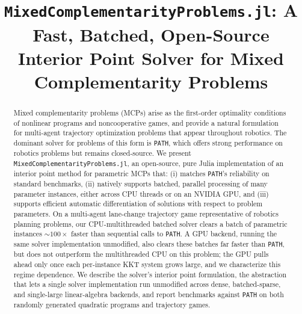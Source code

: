\documentclass[conference]{IEEEtran}
\begin{document}
\title{\Large \bf \texttt{MixedComplementarityProblems.jl}: A Fast, Batched,
  Open-Source\\Interior Point Solver for Mixed Complementarity Problems}

\author{
}

\maketitle


\begin{abstract}
Mixed complementarity problems (MCPs) arise as the first-order optimality conditions of
nonlinear programs and noncooperative games, and provide a natural formulation for
multi-agent trajectory optimization problems that appear throughout robotics. The
dominant solver for problems of this form is \texttt{PATH}, which offers strong
performance on robotics problems but remains closed-source. We present \texttt{MixedComplementarityProblems.jl}, an open-source, pure
Julia implementation of an interior point method for parametric MCPs that: (i) matches
\texttt{PATH}'s reliability on standard benchmarks, (ii) natively supports
batched, parallel processing of many parameter instances,
either across CPU threads or on an NVIDIA GPU, and (iii) supports efficient
automatic differentiation of solutions with respect to problem parameters.
On a multi-agent lane-change trajectory game representative of robotics planning
problems, our CPU-multithreaded batched solver clears a batch of parametric instances
 $\sim\!100\times$ faster than sequential calls to \texttt{PATH}. A GPU
backend, running the same solver implementation unmodified, also clears these batches far
faster than \texttt{PATH}, but does not outperform the multithreaded CPU on this problem;
the GPU pulls ahead only once each per-instance KKT system grows large, and we characterize
this regime dependence. We describe the solver's interior point formulation, the
abstraction that lets a single solver implementation run unmodified across dense,
batched-sparse, and single-large linear-algebra backends, and report benchmarks against
\texttt{PATH} on both randomly generated quadratic programs and trajectory games.
\end{abstract}
\end{document}
